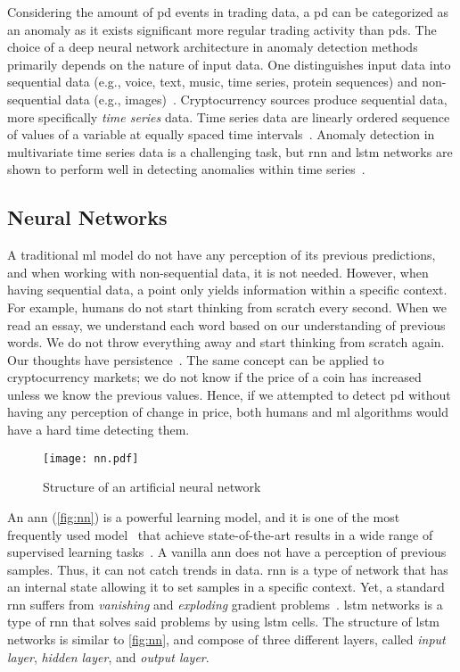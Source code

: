 Considering the amount of \ac{pd} events in trading data, a \ac{pd} can be categorized as an anomaly as it exists significant more regular trading activity than \acp{pd}. The choice of a deep neural network architecture in anomaly detection methods primarily depends on the nature of input data. One distinguishes input data into sequential data (e.g., voice, text, music, time series, protein sequences) and non-sequential data (e.g., images)~\cite{dl_anomaly}. Cryptocurrency sources produce sequential data, more specifically \emph{time series} data. Time series data are linearly ordered sequence of values of a variable at equally spaced time intervals~\cite{stat_handbook}. Anomaly detection in multivariate time series data is a challenging task, but \ac{rnn} and \ac{lstm} networks are shown to perform well in detecting anomalies within time series~\cite{dl_anomaly}.

\subsection{Neural Networks}\label{sec:nn}
A traditional \ac{ml} model do not have any perception of its previous predictions, and when working with non-sequential data, it is not needed. However, when having sequential data, a point only yields information within a specific context. For example, humans do not start thinking from scratch every second. When we read an essay, we understand each word based on our understanding of previous words. We do not throw everything away and start thinking from scratch again. Our thoughts have persistence~\cite{colah}. The same concept can be applied to cryptocurrency markets; we do not know if the price of a coin has increased unless we know the previous values. Hence, if we attempted to detect \ac{pd} without having any perception of change in price, both humans and \ac{ml} algorithms would have a hard time detecting them.

\begin{figure}
    \centering
    \texttt{[image: nn.pdf]}
    \caption{Structure of an artificial neural network}
    \label{fig:nn}
\end{figure}

An \ac{ann} (\autoref{fig:nn}) is a powerful learning model, and it is one of the most frequently used model~\cite{hunt1992neural} that achieve state-of-the-art results in a wide range of supervised learning tasks~\cite{lipton2015critical}. A vanilla \ac{ann} does not have a perception of previous samples. Thus, it can not catch trends in data. \ac{rnn} is a type of network that has an internal state allowing it to set samples in a specific context. Yet, a standard \ac{rnn} suffers from \emph{vanishing} and \emph{exploding} gradient problems~\cite{bengio1994learning}. \ac{lstm} networks is a type of \ac{rnn} that solves said problems by using \ac{lstm} cells. The structure of \ac{lstm} networks is similar to \autoref{fig:nn}, and compose of three different layers, called \emph{input layer}, \emph{hidden layer}, and \emph{output layer}.

